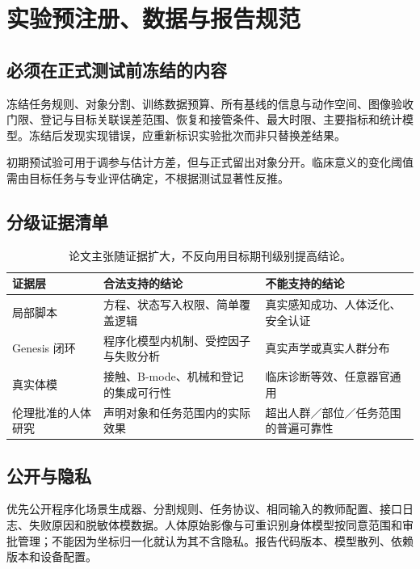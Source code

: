 \documentclass[UTF8,11pt,a4paper,fontset=fandol]{ctexart}
\numberwithin{equation}{section}
\theoremstyle{definition}
\begin{document}
\section{实验预注册、数据与报告规范}
\label{app:prereg}
\subsection{必须在正式测试前冻结的内容}
冻结任务规则、对象分割、训练数据预算、所有基线的信息与动作空间、图像验收门限、登记与目标关联误差范围、恢复和接管条件、最大时限、主要指标和统计模型。冻结后发现实现错误，应重新标识实验批次而非只替换差结果。

初期预试验可用于调参与估计方差，但与正式留出对象分开。临床意义的变化阈值需由目标任务与专业评估确定，不根据测试显著性反推。

\subsection{分级证据清单}
\begin{table}[htbp]\centering\small
\begin{tabularx}{\linewidth}{P{27mm}YY}
\toprule
证据层 & 合法支持的结论 & 不能支持的结论\\\midrule
局部脚本 & 方程、状态写入权限、简单覆盖逻辑 & 真实感知成功、人体泛化、安全认证\\
Genesis 闭环 & 程序化模型内机制、受控因子与失败分析 & 真实声学或真实人群分布\\
真实体模 & 接触、B-mode、机械和登记的集成可行性 & 临床诊断等效、任意器官通用\\
伦理批准的人体研究 & 声明对象和任务范围内的实际效果 & 超出人群／部位／任务范围的普遍可靠性\\\bottomrule
\end{tabularx}
\caption{论文主张随证据扩大，不反向用目标期刊级别提高结论。}
\end{table}

\subsection{公开与隐私}
优先公开程序化场景生成器、分割规则、任务协议、相同输入的教师配置、接口日志、失败原因和脱敏体模数据。人体原始影像与可重识别身体模型按同意范围和审批管理；不能因为坐标归一化就认为其不含隐私。报告代码版本、模型散列、依赖版本和设备配置。
\end{document}
